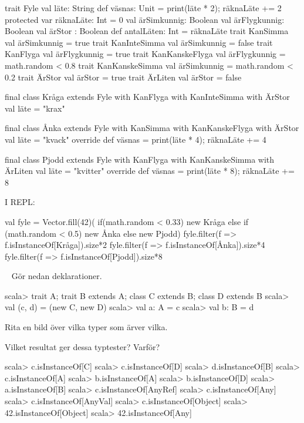 \SOLUTION

\TaskSolved \what


\begin{Code}
trait Fyle {
  val läte: String
  def väsnas: Unit = { print(läte * 2); räknaLäte += 2 }
  protected var räknaLäte: Int = 0
  val ärSimkunnig: Boolean
  val ärFlygkunnig: Boolean
  val ärStor : Boolean
  def antalLäten: Int = räknaLäte
}
trait KanSimma { val ärSimkunnig = true }
trait KanInteSimma { val ärSimkunnig = false }
trait KanFlyga { val ärFlygkunnig = true }
trait KanKanskeFlyga { val ärFlygkunnig = math.random < 0.8 }
trait KanKanskeSimma { val ärSimkunnig = math.random < 0.2 }
trait ÄrStor { val ärStor = true }
trait ÄrLiten { val ärStor = false }

final class Kråga
  extends Fyle
  with KanFlyga
  with KanInteSimma
  with ÄrStor{
  val läte = "krax"
}

final class Ånka
  extends Fyle
  with KanSimma
  with KanKanskeFlyga
  with ÄrStor{
  val läte = "kvack"
  override def väsnas = { print(läte * 4); räknaLäte += 4 }
}

final class Pjodd
  extends Fyle
  with KanFlyga
  with KanKanskeSimma
  with ÄrLiten{
  val läte = "kvitter"
  override def väsnas = { print(läte * 8); räknaLäte += 8 }
}
\end{Code}

I REPL:
\begin{REPL}
val fyle = Vector.fill(42)(
  if(math.random < 0.33) new Kråga else
  if (math.random < 0.5) new Ånka else
  new Pjodd)
fyle.filter(f => f.isInstanceOf[Kråga]).size*2
fyle.filter(f => f.isInstanceOf[Ånka]).size*4
fyle.filter(f => f.isInstanceOf[Pjodd]).size*8
\end{REPL}

\QUESTEND






\QUESTBEGIN

\Task  \what~  Gör nedan deklarationer.
\begin{REPL}
scala> trait A; trait B extends A; class C extends B; class D extends B
scala> val (c, d) = (new C, new D)
scala> val a: A = c
scala> val b: B = d
\end{REPL}

\Subtask Rita en bild över vilka typer som ärver vilka.

\Subtask Vilket resultat ger dessa typtester? Varför?
\begin{REPL}
scala> c.isInstanceOf[C]
scala> c.isInstanceOf[D]
scala> d.isInstanceOf[B]
scala> c.isInstanceOf[A]
scala> b.isInstanceOf[A]
scala> b.isInstanceOf[D]
scala> a.isInstanceOf[B]
scala> c.isInstanceOf[AnyRef]
scala> c.isInstanceOf[Any]
scala> c.isInstanceOf[AnyVal]
scala> c.isInstanceOf[Object]
scala> 42.isInstanceOf[Object]
scala> 42.isInstanceOf[Any]
\end{REPL}

